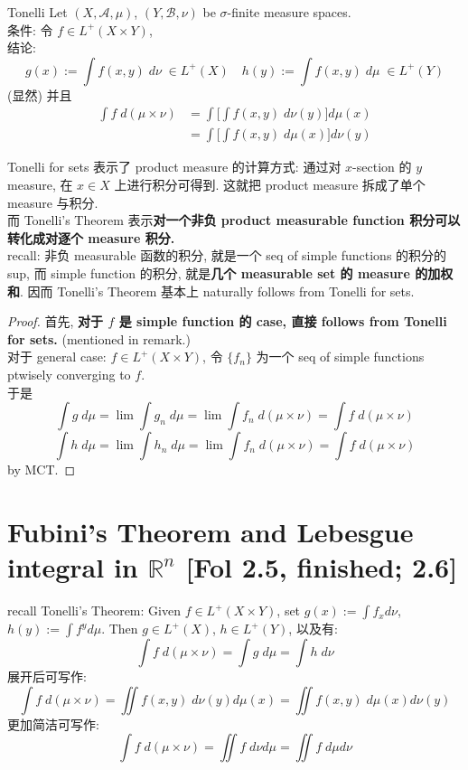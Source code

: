 \documentclass[lang=cn,11pt]{elegantbook}
\begin{document}
\begin{theorem}{Tonelli}
 Let $(X,\mathcal{A}, \mu)$, $(Y, \mathcal{B}, \nu)$ be $\sigma$-finite measure spaces.\\
条件: 令 $f \in L^+ (X \times Y)$,\\
结论:$$g(x) := \int f(x,y) \; d\nu\; \in L^+(X)\quad h(y) := \int f(x,y) \; d\mu \; \in L^+(Y) $$ (显然) 并且
\begin{align}
    \int f \; d(\mu\times \nu) &= \int \Big[   \int f(x,y) \; d\nu(y)  \Big] d\mu(x)\\
    &=  \int \Big[   \int f(x,y) \; d\mu(x)  \Big] d\nu(y)
\end{align}
\end{theorem}\begin{remark}
    Tonelli for sets 表示了 product measure 的计算方式: 通过对 $x$-section 的 $y$ measure, 在 $x\in X$ 上进行积分可得到. 这就把 product measure 拆成了单个 measure 与积分.\\
    而 Tonelli's Theorem 表示\textbf{对一个非负 product measurable function 积分可以转化成对逐个 measure 积分.} \\
recall: 非负 measurable 函数的积分, 就是一个 seq of simple functions 的积分的 sup, 而 simple function 的积分, 就是\textbf{几个 measurable set 的 measure 的加权和}.
因而 Tonelli's Theorem 基本上 naturally follows from Tonelli for sets.
\end{remark}
\begin{proof}
首先,\textbf{ 对于 $f$ 是 simple function 的 case, 直接 follows from Tonelli for sets.} (mentioned in remark.)\\
对于 general case: $f \in L^+(X\times Y)$, 令 $\{f_n\}$ 为一个 seq of simple functions ptwisely converging to $f$.\\
于是 \[
\int g \; d\mu = \lim \int g_n \; d\mu  = \lim \int f_n \;  d(\mu\times \nu) = \int f \; d(\mu\times \nu)
\]
\[
\int h \; d\mu = \lim \int h_n \; d\mu  = \lim \int f_n \;  d(\mu\times \nu) = \int f \; d(\mu\times \nu)
\]
by MCT.
\end{proof}


\chapter{Fubini's Theorem and Lebesgue integral in $\mathbb{R}^n$ [Fol 2.5, finished; 2.6]}
recall Tonelli's Theorem: Given $f \in L^+(X \times Y)$, set $g(x) := \int f_x d\nu $, $h(y) := \int f^y d \mu$. 
Then $g \in L^+(X)$, $h \in L^+(Y)$, 以及有: \[
\int f \; d(\mu \times \nu) = \int g \; d \mu = \int h \; d\nu
\]
展开后可写作: \[
\int f \; d(\mu \times \nu)  = \iint  f(x,y) \; d\nu(y) d\mu(x) = \iint f(x,y) \; d\mu(x) d\nu(y)
\]更加简洁可写作: \[
\int f \; d(\mu \times \nu) = \iint f \; d\nu d\mu  = \iint f \; d\mu d\nu
\]
\end{document}
